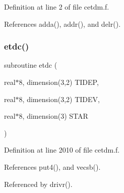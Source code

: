 Definition at line 2 of file cetdm.\+f.



References adda(), addr(), and delr().

\mbox{\label{cetdm_8f_a9cc2587e6a72834bb4057ff69cac4e6e}} 
\subsubsection{\texorpdfstring{etdc()}{etdc()}}
{\footnotesize\ttfamily subroutine etdc (\begin{DoxyParamCaption}\item[{real$\ast$8, dimension(3,2)}]{T\+I\+D\+EP,  }\item[{real$\ast$8, dimension(3,2)}]{T\+I\+D\+EV,  }\item[{real$\ast$8, dimension(3)}]{S\+T\+AR }\end{DoxyParamCaption})}



Definition at line 2010 of file cetdm.\+f.



References put4(), and vecsb().



Referenced by drivr().

\mbox{\label{cetdm_8f_a6de6ec5ec80148a5251387f7f3ddcd80}} 
